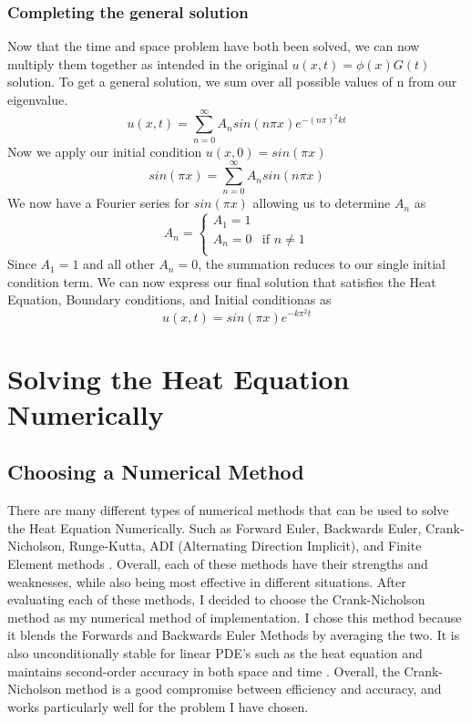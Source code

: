 \documentclass[12pt, reqno]{amsart}
\begin{document}
\subsubsection{Completing the general solution}
Now that the time and space problem have both been solved, we can now multiply them together as intended in the original $u(x,t) = \phi(x)G(t)$ solution. To get a general solution, we sum over all possible values of n from our eigenvalue.
\begin{equation*}
u(x,t) = \sum_{n=0}^{\infty}A_nsin(n\pi x)e^{-(n\pi)^2kt}
\end{equation*}
Now we apply our initial condition $u(x,0) = sin(\pi x)$
\begin{equation*}
sin(\pi x) = \sum_{n=0}^{\infty}A_nsin(n\pi x)
\end{equation*}
We now have a Fourier series for $sin(\pi x)$ allowing us to determine $A_n$ as
\[
A_n = 
\begin{cases}
A_1 =1 \\
A_n = 0 & \text{if } n \neq 1 \\
\end{cases}\]
Since $A_1 = 1$ and all other $A_n = 0$, the summation reduces to our single initial condition term. We can now express our final solution that satisfies the Heat Equation, Boundary conditions, and Initial conditionas as
\begin{equation*}
u(x,t) = sin(\pi x)e^{-k\pi^2 t}
\end{equation*}

\section{Solving the Heat Equation Numerically}
\subsection{Choosing a Numerical Method}
There are many different types of numerical methods that can be used to solve the Heat Equation Numerically. Such as Forward Euler, Backwards Euler, Crank-Nicholson, Runge-Kutta, ADI (Alternating Direction Implicit), and Finite Element methods \cite{2}. Overall, each of these methods have their strengths and weaknesses, while also being most effective in different situations. After evaluating each of these methods, I decided to choose the Crank-Nicholson method as my numerical method of implementation. I chose this method because it blends the Forwards and Backwards Euler Methods by averaging the two. It is also unconditionally stable for linear PDE's such as the heat equation and maintains second-order accuracy in both space and time \cite{3}. Overall, the Crank-Nicholson method is a good compromise between efficiency and accuracy, and works particularly well for the problem I have chosen.
\end{document}
